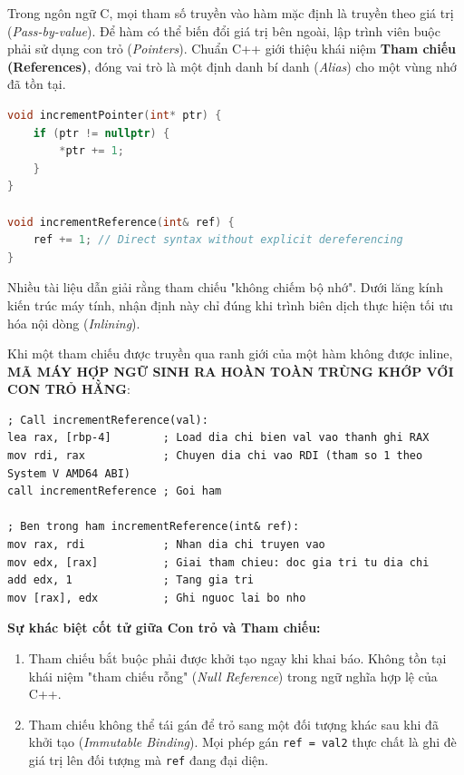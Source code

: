 \documentclass[12pt,a4paper,oneside]{book}
\begin{document}
Trong ngôn ngữ C, mọi tham số truyền vào hàm mặc định là truyền theo giá trị (\textit{Pass-by-value}). Để hàm có thể biến đổi giá trị bên ngoài, lập trình viên buộc phải sử dụng con trỏ (\textit{Pointers}). Chuẩn C++ giới thiệu khái niệm \textbf{Tham chiếu (References)}, đóng vai trò là một định danh bí danh (\textit{Alias}) cho một vùng nhớ đã tồn tại.

\begin{lstlisting}[language=C++]
void incrementPointer(int* ptr) {
    if (ptr != nullptr) {
        *ptr += 1;
    }
}

void incrementReference(int& ref) {
    ref += 1; // Direct syntax without explicit dereferencing
}
\end{lstlisting}

\begin{underhoodbox}
Nhiều tài liệu dẫn giải rằng tham chiếu "không chiếm bộ nhớ". Dưới lăng kính kiến trúc máy tính, nhận định này chỉ đúng khi trình biên dịch thực hiện tối ưu hóa nội dòng (\textit{Inlining}). 

Khi một tham chiếu được truyền qua ranh giới của một hàm không được inline, \textbf{MÃ MÁY HỢP NGỮ SINH RA HOÀN TOÀN TRÙNG KHỚP VỚI CON TRỎ HẰNG}:
\begin{lstlisting}[language={[x86masm]Assembler}]
; Call incrementReference(val):
lea rax, [rbp-4]        ; Load dia chi bien val vao thanh ghi RAX
mov rdi, rax            ; Chuyen dia chi vao RDI (tham so 1 theo System V AMD64 ABI)
call incrementReference ; Goi ham

; Ben trong ham incrementReference(int& ref):
mov rax, rdi            ; Nhan dia chi truyen vao
mov edx, [rax]          ; Giai tham chieu: doc gia tri tu dia chi
add edx, 1              ; Tang gia tri
mov [rax], edx          ; Ghi nguoc lai bo nho
\end{lstlisting}
\textbf{Sự khác biệt cốt tử giữa Con trỏ và Tham chiếu:}
\begin{enumerate}
    \item Tham chiếu bắt buộc phải được khởi tạo ngay khi khai báo. Không tồn tại khái niệm "tham chiếu rỗng" (\textit{Null Reference}) trong ngữ nghĩa hợp lệ của C++.
    \item Tham chiếu không thể tái gán để trỏ sang một đối tượng khác sau khi đã khởi tạo (\textit{Immutable Binding}). Mọi phép gán \texttt{ref = val2} thực chất là ghi đè giá trị lên đối tượng mà \texttt{ref} đang đại diện.
\end{enumerate}
\end{underhoodbox}
\end{document}
